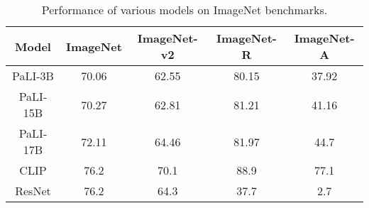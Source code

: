 \begin{table}[h]
\centering
\scriptsize
\begin{tabular}{c c c c c}
\hline
\textbf{Model} & \textbf{ImageNet} & \textbf{ImageNet-v2} & \textbf{ImageNet-R} & \textbf{ImageNet-A} \\
\hline
PaLI-3B & 70.06 & 62.55 & 80.15 & 37.92 \\

PaLI-15B & 70.27 & 62.81 & 81.21 & 41.16 \\

PaLI-17B & 72.11 & 64.46 & 81.97 & 44.7 \\

CLIP & 76.2 & 70.1 & 88.9 & 77.1 \\

ResNet & 76.2 & 64.3 & 37.7 & 2.7 \\
\hline
\end{tabular}
\caption{Performance of various models on ImageNet benchmarks.}
\label{tab:imagenet_results}
\end{table}